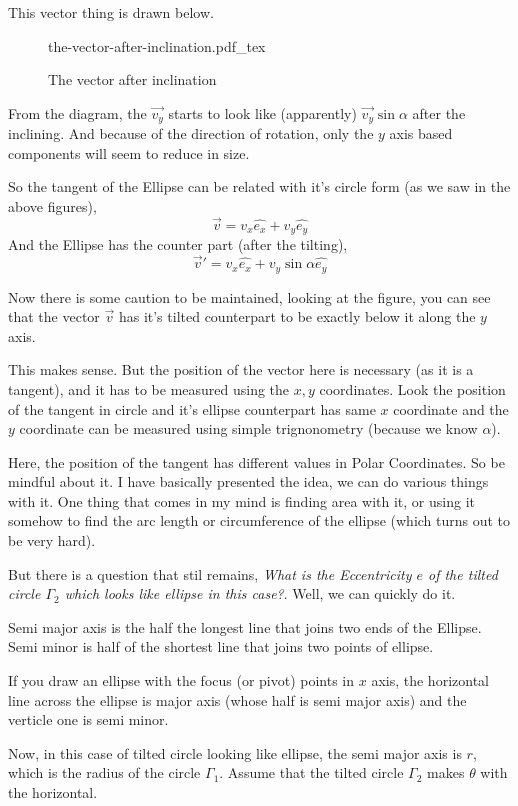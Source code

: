 \documentclass[12pt,a4paper]{article}
\newcommand{\incfig}[1]{%
    \def\svgwidth{0.7\columnwidth}
    {#1.pdf_tex}
}
\begin{document}
This vector thing is drawn below.
\begin{figure}[ht!]
    \centering
    \incfig{the-vector-after-inclination}
    \caption{The vector after inclination}
    \label{fig:the-vector-after-inclination}
\end{figure}
From the diagram, the $\vec{v_y}$ starts to look like (apparently) $\vec{v_y} \sin \alpha$ after the inclining. And because of the direction of rotation, only the $y$ axis based components will seem to reduce in size. 

So the tangent of the Ellipse can be related with it's circle form (as we saw in the above figures),
\[ 
\vec{v} = v_x \hat{e_x} + v_y \hat{e_y}
\]
And the Ellipse has the counter part (after the tilting),
\[ 
\vec{v}' = v_x \hat{e_x} + v_y \sin \alpha \hat{ e_y}
\]

Now there is some caution to be maintained, looking at the figure, you can see that the vector $\vec{v}$ has it's tilted counterpart  to be exactly below it  along the $y$ axis. 

This makes sense. But the position of the vector here is necessary (as it is a tangent), and it has to be measured using the $x,y$ coordinates. Look the position of the tangent in circle and it's ellipse counterpart has same $x$ coordinate and the $y$ coordinate can be measured using simple trignonometry (because we know $\alpha$). 

Here, the position of the tangent has different values in Polar Coordinates. So be mindful about it. I have basically presented the idea, we can do various things with it. One thing that comes in my mind is finding area with it, or using it somehow to find the arc length or circumference of the ellipse (which turns out to be very hard). 

But there is a question that stil remains, \emph{What is the Eccentricity $e$ of the tilted circle $\Gamma_2$ which looks like ellipse in this case?}. Well, we can quickly do it.

Semi major axis is the half the longest line that joins two ends of the Ellipse. Semi minor is half of the shortest line that joins two points of ellipse.

If you draw an ellipse with the focus (or pivot) points in $x$ axis, the horizontal line across the ellipse is major axis (whose half is semi major axis) and the verticle one is semi minor. 

Now, in this case of tilted circle looking like ellipse, the semi major axis is $r$, which is the radius of the circle $\Gamma_1$. Assume that the tilted circle $\Gamma_2$ makes $\theta$ with the horizontal. 
\end{document}
